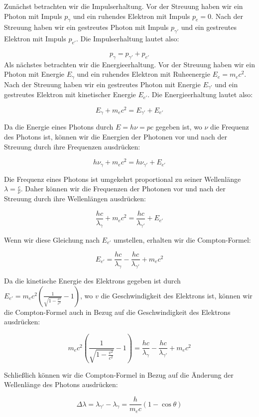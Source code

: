 \documentclass[12pt,a4paper,ngerman]{report}
\begin{document}
			Zunächst betrachten wir die Impulserhaltung. Vor der Streuung haben wir ein Photon mit Impuls $p_{\gamma}$ und ein ruhendes Elektron mit Impuls $p_e = 0$. Nach der Streuung haben wir ein gestreutes Photon mit Impuls $p_{\gamma'}$ und ein gestreutes Elektron mit Impuls $p_{e'}$. Die Impulserhaltung lautet also:

\[p_{\gamma} = p_{\gamma'} + p_{e'}\]
Als nächstes betrachten wir die Energieerhaltung. Vor der Streuung haben wir ein Photon mit Energie $E_{\gamma}$ und ein ruhendes Elektron mit Ruheenergie $E_e = m_e c^2$. Nach der Streuung haben wir ein gestreutes Photon mit Energie $E_{\gamma'}$ und ein gestreutes Elektron mit kinetischer Energie $E_{e'}$. Die Energieerhaltung lautet also:

\[E_{\gamma} + m_e c^2 = E_{\gamma'} + E_{e'}\]

Da die Energie eines Photons durch $E = h \nu = p c$ gegeben ist, wo $\nu$ die Frequenz des Photons ist, können wir die Energien der Photonen vor und nach der Streuung durch ihre Frequenzen ausdrücken:

\[h \nu_{\gamma} + m_e c^2 = h \nu_{\gamma'} + E_{e'}\]

Die Frequenz eines Photons ist umgekehrt proportional zu seiner Wellenlänge $\lambda = \frac{c}{\nu}$. Daher können wir die Frequenzen der Photonen vor und nach der Streuung durch ihre Wellenlängen ausdrücken:

\[\frac{h c}{\lambda_{\gamma}} + m_e c^2 = \frac{h c}{\lambda_{\gamma'}} + E_{e'}\]

Wenn wir diese Gleichung nach $E_{e'}$ umstellen, erhalten wir die Compton-Formel:

\[E_{e'} = \frac{h c}{\lambda_{\gamma}} - \frac{h c}{\lambda_{\gamma'}} + m_e c^2\]

Da die kinetische Energie des Elektrons gegeben ist durch $E_{e'} = m_e c^2 \left(\frac{1}{\sqrt{1 - \frac{v^2}{c^2}}} - 1\right)$, wo $v$ die Geschwindigkeit des Elektrons ist, können wir die Compton-Formel auch in Bezug auf die Geschwindigkeit des Elektrons ausdrücken:

\[m_e c^2 \left(\frac{1}{\sqrt{1 - \frac{v^2}{c^2}}} - 1\right) = \frac{h c}{\lambda_{\gamma}} - \frac{h c}{\lambda_{\gamma'}} + m_e c^2\]

Schließlich können wir die Compton-Formel in Bezug auf die Änderung der Wellenlänge des Photons ausdrücken:

\[\Delta \lambda = \lambda_{\gamma'} - \lambda_{\gamma} = \frac{h}{m_e c} (1 - \cos \theta)\]
\end{document}

